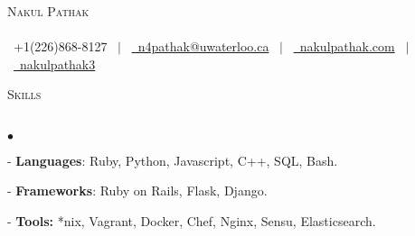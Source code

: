 \documentclass[11pt]{article}
\newcommand{\lineunder}{\vspace*{-8pt} \\ \hspace*{-18pt} \hrulefill \\}
\newcommand{\header}[1]{{\hspace*{-15pt}\vspace*{6pt} \textsc{#1}} \vspace*{-6pt} \lineunder }
\newenvironment{achievements}{\begin{list}{$\bullet$}{\topsep 0pt \itemsep -1.5pt \leftmargin 5pt}}{\vspace*{4pt}\end{list}}
\begin{document}
\small
\smallskip
\vspace*{-45pt}

\begin{center}
  {\Huge \scshape {Nakul Pathak}} \\
\hspace*{-18pt} \hrulefill \\
\vspace{1pt}
\hspace*{-13pt} \faPhone \  +1(226)868-8127 \ $|$ \  \href{mailto:n4pathak@uwaterloo.ca}{\faEnvelope \ n4pathak@uwaterloo.ca} \  $|$ \  \href{http://nakulpathak.com}{\faGlobe \ nakulpathak.com}  \ $|$ \   \href{https://github.com/nakulpathak3}{\faGithub \ nakulpathak3}
\vspace{-5pt}
\end{center}

\vspace{4pt}

\header{\fontsize{11.4}{10}\selectfont Skills}
\begin{achievements}
\item[-] \textbf{Languages}: Ruby, Python, Javascript, C++, SQL, Bash.
\vspace{2pt}
\item[-] \textbf{Frameworks}: Ruby on Rails, Flask, Django.
\vspace{2pt}
\item[-] \textbf{Tools:} *nix, Vagrant, Docker, Chef, Nginx, Sensu, Elasticsearch.
\end{achievements}

\vspace{6pt}
\end{document}
